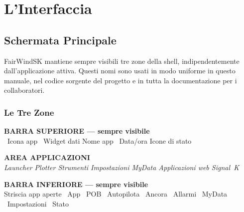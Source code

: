 \part{L'Interfaccia}

\chapter{Schermata Principale}

FairWindSK mantiene sempre visibili tre zone della shell, indipendentemente dall'applicazione
attiva. Questi nomi sono usati in modo uniforme in questo manuale, nel codice sorgente del
progetto e in tutta la documentazione per i collaboratori.

\section{Le Tre Zone}

\begin{center}
\begin{tcolorbox}[enhanced,colback=LtBlue,colframe=Navy,boxrule=1.5pt,arc=4pt,
  top=7pt,bottom=5pt,left=12pt,right=12pt,width=0.96\textwidth]
  {\sffamily\bfseries\color{Navy}BARRA SUPERIORE --- sempre visibile}\\[3pt]
  {\small{}~Icona app \quad
         ~Widget dati \quad
         Nome app \quad
         ~Data/ora \quad
         Icone di stato}
\end{tcolorbox}
\vspace{2pt}
\begin{tcolorbox}[enhanced,colback=white,colframe=Navy,boxrule=1.5pt,arc=4pt,
  top=26pt,bottom=26pt,left=12pt,right=12pt,width=0.96\textwidth]
  \centering
  {\large\sffamily\bfseries\color{MidGray}AREA APPLICAZIONI}\\[4pt]
  {\small\sffamily\color{MidGray}\itshape
    Launcher \textbar{} Plotter \textbar{} Strumenti \textbar{}
    Impostazioni \textbar{} MyData \textbar{} Applicazioni web Signal~K}
\end{tcolorbox}
\vspace{2pt}
\begin{tcolorbox}[enhanced,colback=LtBlue,colframe=Navy,boxrule=1.5pt,arc=4pt,
  top=7pt,bottom=5pt,left=12pt,right=12pt,width=0.96\textwidth]
  {\sffamily\bfseries\color{Navy}BARRA INFERIORE --- sempre visibile}\\[3pt]
  {\small
    Striscia app aperte \quad
    ~App \quad
    ~POB \quad
    ~Autopilota \quad
    ~Ancora \quad
    ~Allarmi \quad
    ~MyData \quad
    ~Impostazioni \quad
    ~Stato}
\end{tcolorbox}
\end{center}

